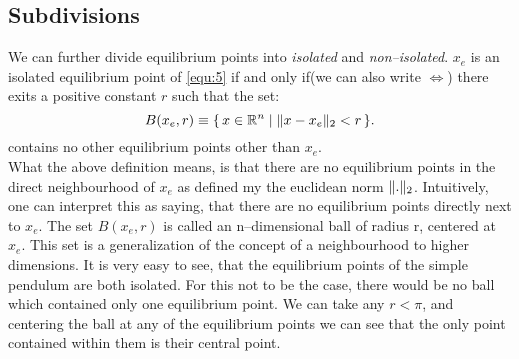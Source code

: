 \subsection{Subdivisions}
We can further divide equilibrium points into \textit{isolated} and \textit{non--isolated}.
{
    $x_e$ is an isolated equilibrium point of \ref{equ:5} if and only if(we can also write $\iff$) there exits a positive constant $r$ such that the set: 
   \[
       B(x_e,r) \equiv \{\,x \in \mathbb{R}^{n} \mid \lVert x - x_e\rVert_2 < r\,\}    
   .\]  
   contains no other equilibrium points other than $x_e$.\\
   What the above definition means, is that there are no equilibrium points in the direct neighbourhood of $x_e$ as defined my the euclidean norm  $\lVert.\rVert_2$. Intuitively, one can interpret this as saying, that there are no equilibrium points directly next to $x_e$. The set $B(x_e,r)$ is called an n--dimensional ball of radius r, centered at $x_e$. This set is a generalization of the concept of a neighbourhood to higher dimensions.
   {
       It is very easy to see, that the equilibrium points of the simple pendulum are both isolated. For this not to be the case, there would be no ball which contained only one equilibrium point. We can take any $r < \pi$, and centering the ball at any of the equilibrium points we can see that the only point contained within them is their central point.
   }
}

